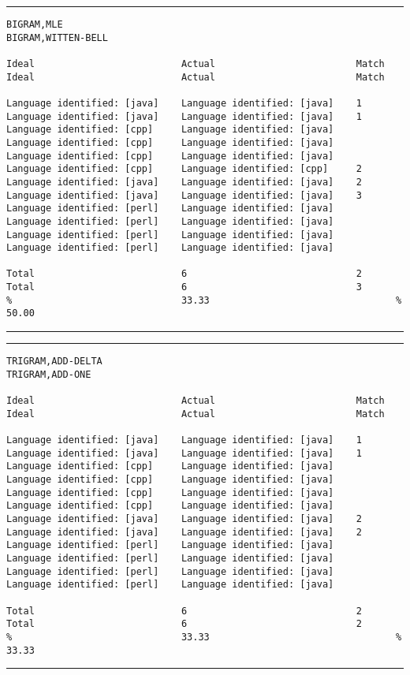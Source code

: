 \clearpage

\tiny
\hrule\vskip4pt
\begin{verbatim}
BIGRAM,MLE                                                           BIGRAM,WITTEN-BELL

Ideal                          Actual                         Match  Ideal                          Actual                         Match

Language identified: [java]    Language identified: [java]    1      Language identified: [java]    Language identified: [java]    1
Language identified: [cpp]     Language identified: [java]           Language identified: [cpp]     Language identified: [java]
Language identified: [cpp]     Language identified: [java]           Language identified: [cpp]     Language identified: [cpp]     2
Language identified: [java]    Language identified: [java]    2      Language identified: [java]    Language identified: [java]    3
Language identified: [perl]    Language identified: [java]           Language identified: [perl]    Language identified: [java]
Language identified: [perl]    Language identified: [java]           Language identified: [perl]    Language identified: [java]

Total                          6                              2      Total                          6                              3
%                              33.33                                 %                              50.00
\end{verbatim}
\vskip4pt\hrule


\tiny
\hrule\vskip4pt
\begin{verbatim}
TRIGRAM,ADD-DELTA                                                    TRIGRAM,ADD-ONE

Ideal                          Actual                         Match  Ideal                          Actual                         Match

Language identified: [java]    Language identified: [java]    1      Language identified: [java]    Language identified: [java]    1
Language identified: [cpp]     Language identified: [java]           Language identified: [cpp]     Language identified: [java]
Language identified: [cpp]     Language identified: [java]           Language identified: [cpp]     Language identified: [java]
Language identified: [java]    Language identified: [java]    2      Language identified: [java]    Language identified: [java]    2
Language identified: [perl]    Language identified: [java]           Language identified: [perl]    Language identified: [java]
Language identified: [perl]    Language identified: [java]           Language identified: [perl]    Language identified: [java]

Total                          6                              2      Total                          6                              2
%                              33.33                                 %                              33.33
\end{verbatim}
\vskip4pt\hrule


